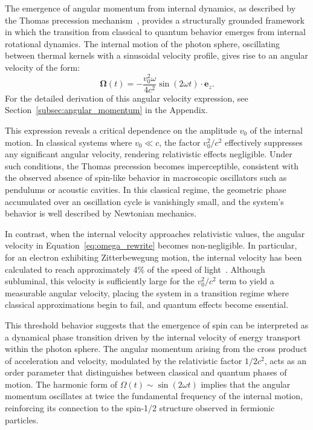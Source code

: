 \documentclass[%
 reprint,
 amsmath,amssymb,
 aps,
]{revtex4-1}
\numberwithin{equation}{section}%
\begin{document}
The emergence of angular momentum from internal dynamics, as described by the Thomas precession mechanism~\cite{hanamura2309.0047,hanamura2501.0130}, provides a structurally grounded framework in which the transition from classical to quantum behavior emerges from internal rotational dynamics. The internal motion of the photon sphere, oscillating between thermal kernels with a sinusoidal velocity profile, gives rise to an angular velocity of the form:
\begin{equation}
\boldsymbol{\Omega}(t) = -\frac{v_0^2 \omega}{4c^2} \sin(2\omega t) \cdot \boldsymbol{e}_z. \label{eq:omega_rewrite}
\end{equation}
For the detailed derivation of this angular velocity expression, see Section~\ref{subsec:angular_momentum} in the Appendix.

This expression reveals a critical dependence on the amplitude \( v_0 \) of the internal motion. In classical systems where \( v_0 \ll c \), the factor \( v_0^2/c^2 \) effectively suppresses any significant angular velocity, rendering relativistic effects negligible. Under such conditions, the Thomas precession becomes imperceptible, consistent with the observed absence of spin-like behavior in macroscopic oscillators such as pendulums or acoustic cavities. In this classical regime, the geometric phase accumulated over an oscillation cycle is vanishingly small, and the system's behavior is well described by Newtonian mechanics.

In contrast, when the internal velocity approaches relativistic values, the angular velocity in Equation~\eqref{eq:omega_rewrite} becomes non-negligible. In particular, for an electron exhibiting Zitterbewegung motion, the internal velocity has been calculated to reach approximately 4\% of the speed of light~\cite{hanamura2501.0130}. Although subluminal, this velocity is sufficiently large for the \( v_0^2/c^2 \) term to yield a measurable angular velocity, placing the system in a transition regime where classical approximations begin to fail, and quantum effects become essential.

This threshold behavior suggests that the emergence of spin can be interpreted as a dynamical phase transition driven by the internal velocity of energy transport within the photon sphere. The angular momentum arising from the cross product of acceleration and velocity, modulated by the relativistic factor \( 1/2c^2 \), acts as an order parameter that distinguishes between classical and quantum phases of motion. The harmonic form of \( \Omega(t) \sim \sin(2\omega t) \) implies that the angular momentum oscillates at twice the fundamental frequency of the internal motion, reinforcing its connection to the spin-1/2 structure observed in fermionic particles.
\end{document}
